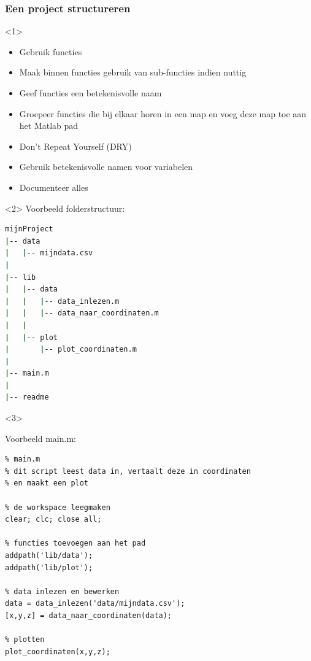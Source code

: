 \documentclass[t]{beamer}
\begin{document}
\begin{frame}[fragile]
	\frametitle{Een project structureren}
\begin{onlyenv}<1>
	\begin{itemize}
		\item Gebruik functies
		\item Maak binnen functies gebruik van sub-functies indien nuttig
		\item Geef functies een betekenisvolle naam
		\item Groepeer functies die bij elkaar horen in een map en voeg deze map toe aan het Matlab pad
		\item Don't Repeat Yourself (DRY)
		\item Gebruik betekenisvolle namen voor variabelen
		\item Documenteer alles
	\end{itemize}
\end{onlyenv}
\begin{onlyenv}<2>
Voorbeeld folderstructuur:

	\begin{lstlisting}[language=bash]
mijnProject	
|-- data
|   |-- mijndata.csv
|
|-- lib
|   |-- data
|   |   |-- data_inlezen.m
|   |   |-- data_naar_coordinaten.m
|   |
|   |-- plot
|       |-- plot_coordinaten.m
|
|-- main.m
|
|-- readme
	\end{lstlisting}
\end{onlyenv}
\begin{onlyenv}<3>

Voorbeeld main.m:
	\begin{lstlisting}
% main.m
% dit script leest data in, vertaalt deze in coordinaten
% en maakt een plot

% de workspace leegmaken
clear; clc; close all;

% functies toevoegen aan het pad
addpath('lib/data');
addpath('lib/plot');

% data inlezen en bewerken
data = data_inlezen('data/mijndata.csv');
[x,y,z] = data_naar_coordinaten(data);

% plotten
plot_coordinaten(x,y,z);
	\end{lstlisting}	
	
\end{onlyenv}
\end{frame}
\end{document}
